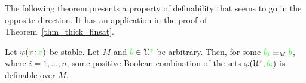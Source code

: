 



The following theorem presents a property of definability that seems to go in the opposite direction.
It has an application in the proof of Theorem~\ref{thm_thick_finsat}.

\begin{theorem}\label{thm_stability_definable_rovescio1}
  Let $\varphi({\color{brown} x}\,;{\color{green} z})$ be stable.
  Let $M$ and ${\color{green} b}\in\EuScript U^{\color{green} z}$ be arbitrary.
  Then, for some ${\color{green} b_i}\equiv_M{\color{green} b}$, where $i=1,\dots,n$, some positive Boolean combination of the sets $\varphi(\EuScript U^{\color{brown} x};{\color{green} b_i})$ is definable over $M$.
\end{theorem}

